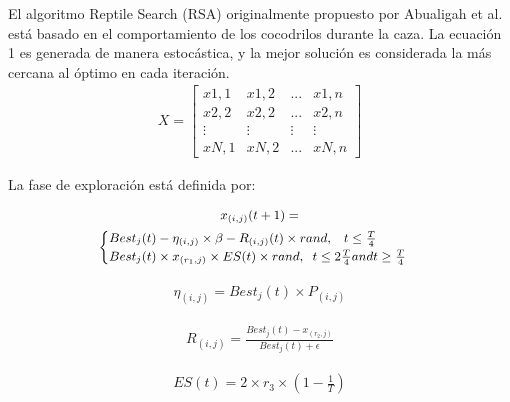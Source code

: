 \documentclass[conference]{IEEEtran}
\begin{document}
\noindent El algoritmo Reptile Search (RSA) originalmente propuesto por Abualigah et al.~\cite{Abualigah2022} está basado en el comportamiento de los cocodrilos durante la caza. 
\noindent La ecuación 1 es generada de manera estocástica, y la mejor solución es considerada la más cercana al óptimo en cada iteración.
\begin{equation}
	\begin{gathered}
		X= \begin{bmatrix}
			x1,1 & x1,2 & ... & x1,n  \\
			x2,2 & x2,2 & ... & x2,n  \\
			\vdots & \vdots & \vdots & \vdots \\
			xN,1 & xN,2 & ... & xN,n
		\end{bmatrix}
	\end{gathered}
	\label{eq33}
\end{equation}

\noindent La fase de exploración está definida por:

\begin{equation}
	\small
	\begin{gathered}
		x_{(i,j)}(t+1)=\\
		\begin{cases}
			Best_j (t) - \eta_{(i,j)}\times \beta-R_{(i,j)}(t)\times rand, \; \; \; t \leq \frac{T}{4}               \\
			Best_j (t) \times x_{(r_1,j)} \times ES(t) \times rand, \; \; t \leq 2\frac{T}{4} and t \geq \frac{T}{4} \\
		\end{cases}
	\end{gathered}
	\label{eq34}
\end{equation}   

\begin{equation}
	\begin{gathered}
		\eta_{(i,j)}=Best_j(t)\times P_{(i,j)}
	\end{gathered}
	\label{eq35}
\end{equation}

\begin{equation}
	\begin{gathered}
		R_{(i,j)}=\frac{Best_j(t) - x_{(r_2,j)}}{Best_j(t) +\epsilon}
	\end{gathered}
	\label{eq36}
\end{equation}

\begin{equation}
	\begin{gathered}
		ES(t)=2 \times r_3 \times (1 - \frac{1}{T})
	\end{gathered}
	\label{eq37}
\end{equation}
\end{document}
